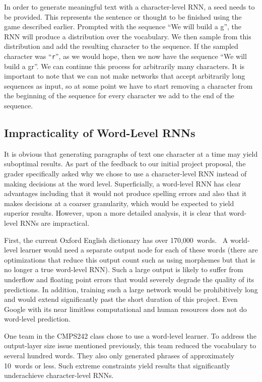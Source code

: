 \documentclass{article}
\begin{document}
In order to generate meaningful text with a character-level RNN, a seed needs to be provided.  This represents the sentence or thought to be finished using the game described earlier. Prompted with the sequence ``We will build a g'', the RNN will produce a distribution over the vocabulary. We then sample from this distribution and add the resulting character to the sequence. If the sampled character was ``\texttt{r}'', as we would hope, then we now have the sequence ``We will build a gr''. We can continue this process for arbitrarily many characters. It is important to note that we can not make networks that accept arbitrarily long sequences as input, so at some point we have to start removing a character from the beginning of the sequence for every character we add to the end of the sequence.

\subsection{Impracticality of Word-Level RNNs}\label{sec:wordLevelRnn}

It is obvious that generating paragraphs of text one character at a time may yield suboptimal results.  As part of the feedback to our initial project proposal, the grader specifically asked why we chose to use a character-level RNN instead of making decisions at the word level.  Superficially, a word-level RNN has clear advantages including that it would not produce spelling errors and also that it makes decisions at a coarser granularity, which would be expected to yield superior results.  However, upon a more detailed analysis, it is clear that word-level RNNs are impractical.

First, the current Oxford English dictionary has over 170,000~words.~\cite{oxfordWordCount} A world-level learner would need a separate output node for each of these words (there are optimizations that reduce this output count such as using morphemes but that is no longer a true word-level RNN).  Such a large output is likely to suffer from underflow and floating point errors that would severely degrade the quality of its predictions.  In addition, training such a large network would be prohibitively long and would extend significantly past the short duration of this project.  Even Google with its near limitless computational and human resources does not do word-level prediction.

One team in the CMPS242 class chose to use a word-level learner.  To address the output-layer size issue mentioned previously, this team reduced the vocabulary to several hundred words.  They also only generated phrases of approximately 10~words or less.  Such extreme constraints yield results that significantly underachieve character-level RNNs.
\end{document}
